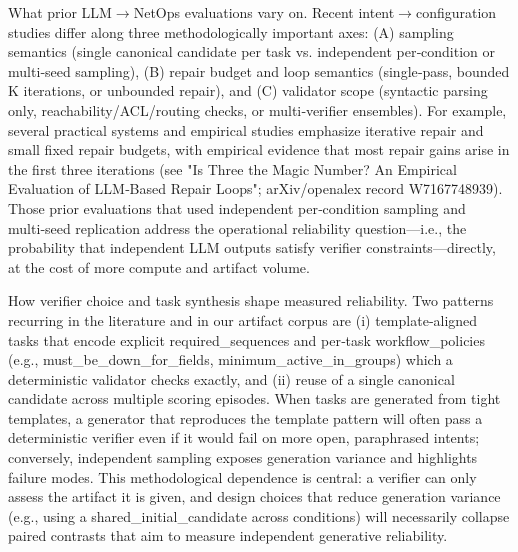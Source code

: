 \documentclass[conference]{IEEEtran}
\begin{document}
What prior LLM\ensuremath{\rightarrow}NetOps evaluations vary on. Recent intent\ensuremath{\rightarrow}configuration studies differ along three methodologically important axes: (A) sampling semantics (single canonical candidate per task vs. independent per‑condition or multi‑seed sampling), (B) repair budget and loop semantics (single‑pass, bounded K iterations, or unbounded repair), and (C) validator scope (syntactic parsing only, reachability/ACL/routing checks, or multi‑verifier ensembles). For example, several practical systems and empirical studies emphasize iterative repair and small fixed repair budgets, with empirical evidence that most repair gains arise in the first three iterations (see "Is Three the Magic Number? An Empirical Evaluation of LLM‑Based Repair Loops"; arXiv/openalex record W7167748939). Those prior evaluations that used independent per‑condition sampling and multi‑seed replication address the operational reliability question---i.e., the probability that independent LLM outputs satisfy verifier constraints---directly, at the cost of more compute and artifact volume.

How verifier choice and task synthesis shape measured reliability. Two patterns recurring in the literature and in our artifact corpus are (i) template‑aligned tasks that encode explicit required\_sequences and per‑task workflow\_policies (e.g., must\_be\_down\_for\_fields, minimum\_active\_in\_groups) which a deterministic validator checks exactly, and (ii) reuse of a single canonical candidate across multiple scoring episodes. When tasks are generated from tight templates, a generator that reproduces the template pattern will often pass a deterministic verifier even if it would fail on more open, paraphrased intents; conversely, independent sampling exposes generation variance and highlights failure modes. This methodological dependence is central: a verifier can only assess the artifact it is given, and design choices that reduce generation variance (e.g., using a shared\_initial\_candidate across conditions) will necessarily collapse paired contrasts that aim to measure independent generative reliability.
\end{document}
